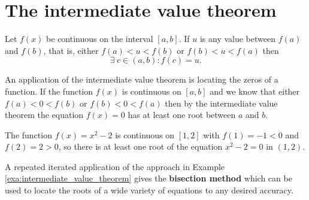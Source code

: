 \section{The intermediate value theorem}

\begin{theorem}
    Let $f(x)$ be continuous on the interval $[a,b]$. If $u$ is any value between $f(a)$ and $f(b)$, that is, either $f(a)<u<f(b)$ or $f(b)<u<f(a)$ then \[\exists\;c\in(a,b):f(c)=u.\]
\end{theorem}

An application of the intermediate value theorem is locating the zeros of a function. If the function $f(x)$ is continuous on $[a,b]$ and we know that either $f(a)<0<f(b)$ or $f(b)<0<f(a)$ then by the intermediate value theorem the equation $f(x)=0$ has at least one root between $a$ and $b$.

\begin{example}\label{exa:intermediate_value_theorem}
    The function $f(x)=x^2-2$ is continuous on $[1,2]$ with $f(1)=-1<0$ and $f(2)=2>0$, so there is at least one root of the equation $x^2-2=0$ in $(1,2)$.
\end{example}

\begin{remark}
    A repeated iterated application of the approach in Example \ref{exa:intermediate_value_theorem} gives the \textbf{bisection method} which can be used to locate the roots of a wide variety of equations to any desired accuracy.
\end{remark}
